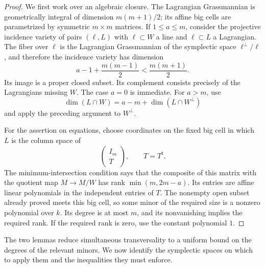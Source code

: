 \begin{proof}
We first work over an algebraic closure.  The Lagrangian Grassmannian
is geometrically integral of dimension $m(m+1)/2$; its affine big cells
are parametrized by symmetric $m\times m$ matrices.  If $1\leq a\leq m$,
consider the projective incidence variety of pairs $(\ell,L)$ with
$\ell\subset W$ a line and $\ell\subset L$ a Lagrangian.  The fiber over
$\ell$ is the Lagrangian Grassmannian of the symplectic space
$\ell^\perp/\ell$, and therefore the incidence variety has dimension
\[
 a-1+\frac{m(m-1)}2<\frac{m(m+1)}2.
\]
Its image is a proper closed subset.  Its complement consists precisely
of the Lagrangians missing $W$.  The case $a=0$ is immediate.  For
$a>m$, use
\[
 \dim(L\cap W)=a-m+\dim(L\cap W^\perp)
\]
and apply the preceding argument to $W^\perp$.

For the assertion on equations, choose coordinates on the fixed big
cell in which $L$ is the column space of
\[
 \begin{pmatrix}I_m\\ T\end{pmatrix},\qquad T=T^{\mathsf t}.
\]
The minimum-intersection condition says that the composite of this
matrix with the quotient map $M\longrightarrow M/W$ has rank
$\min(m,2m-a)$.  Its entries are affine linear polynomials in the
independent entries of $T$.  The nonempty open subset already proved
meets this big cell, so some minor of the required size is a nonzero
polynomial over $k$.  Its degree is at most $m$, and its nonvanishing
implies the required rank.  If the required rank is zero, use the
constant polynomial $1$.
\end{proof}


The two lemmas reduce simultaneous transversality to a uniform bound on
the degrees of the relevant minors. We now identify the symplectic
spaces on which to apply them and the inequalities they must enforce.


